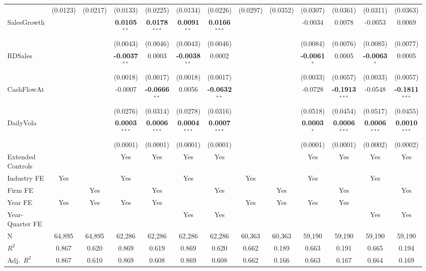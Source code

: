 \begin{landscape}
\begin{table}[H]
\begin{tabular}{lcccccccccccc}
 & (0.0123) & (0.0217) & (0.0133) & (0.0225) & (0.0134) & (0.0226) & (0.0297) & (0.0352) & (0.0307) & (0.0361) & (0.0311) & (0.0363) \\
SalesGrowth &  &  & \textbf{0.0105}$^{**}$ & \textbf{0.0178}$^{***}$ & \textbf{0.0091}$^{**}$ & \textbf{0.0166}$^{***}$ &  &  & -0.0034 & 0.0078 & -0.0053 & 0.0069 \\
 &  &  & (0.0043) & (0.0046) & (0.0043) & (0.0046) &  &  & (0.0084) & (0.0076) & (0.0085) & (0.0077) \\
RDSales &  &  & \textbf{-0.0037}$^{**}$ & 0.0003 & \textbf{-0.0038}$^{**}$ & 0.0002 &  &  & \textbf{-0.0061}$^{*}$ & 0.0005 & \textbf{-0.0063}$^{*}$ & 0.0005 \\
 &  &  & (0.0018) & (0.0017) & (0.0018) & (0.0017) &  &  & (0.0033) & (0.0057) & (0.0033) & (0.0057) \\
CashFlowAt &  &  & -0.0007 & \textbf{-0.0666}$^{**}$ & 0.0056 & \textbf{-0.0632}$^{**}$ &  &  & -0.0728 & \textbf{-0.1913}$^{***}$ & -0.0548 & \textbf{-0.1811}$^{***}$ \\
 &  &  & (0.0276) & (0.0314) & (0.0278) & (0.0316) &  &  & (0.0518) & (0.0454) & (0.0517) & (0.0455) \\
DailyVola &  &  & \textbf{0.0003}$^{***}$ & \textbf{0.0006}$^{***}$ & \textbf{0.0004}$^{***}$ & \textbf{0.0007}$^{***}$ &  &  & \textbf{0.0003}$^{*}$ & \textbf{0.0006}$^{***}$ & \textbf{0.0006}$^{***}$ & \textbf{0.0010}$^{***}$ \\
 &  &  & (0.0001) & (0.0001) & (0.0001) & (0.0001) &  &  & (0.0001) & (0.0001) & (0.0002) & (0.0002) \\
\midrule
Extended Controls &  &  & Yes & Yes & Yes & Yes &  &  & Yes & Yes & Yes & Yes \\
Industry FE & Yes &  & Yes &  & Yes &  & Yes &  & Yes &  & Yes &  \\
Firm FE &  & Yes &  & Yes &  & Yes &  & Yes &  & Yes &  & Yes \\
Year FE & Yes & Yes & Yes & Yes &  &  & Yes & Yes & Yes & Yes &  &  \\
Year-Quarter FE &  &  &  &  & Yes & Yes &  &  &  &  & Yes & Yes \\
\midrule
N & 64,895 & 64,895 & 62,286 & 62,286 & 62,286 & 62,286 & 60,363 & 60,363 & 59,190 & 59,190 & 59,190 & 59,190 \\
$R^2$ & 0.867 & 0.620 & 0.869 & 0.619 & 0.869 & 0.620 & 0.662 & 0.189 & 0.663 & 0.191 & 0.665 & 0.194 \\
Adj.~$R^2$ & 0.867 & 0.610 & 0.869 & 0.608 & 0.869 & 0.608 & 0.662 & 0.166 & 0.663 & 0.167 & 0.664 & 0.169 \\

\end{tabular}
\end{table}
\end{landscape}
